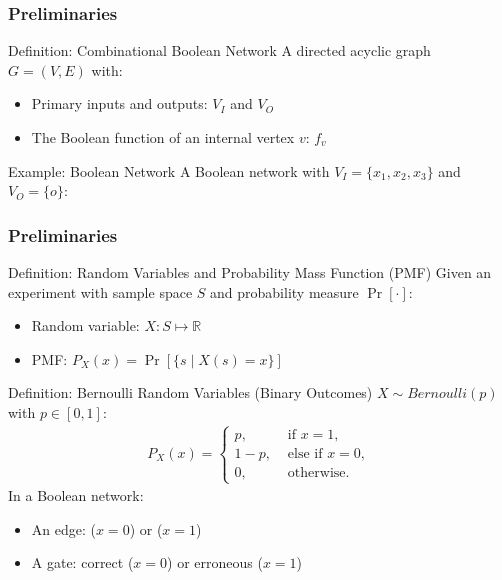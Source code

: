 \begin{frame}
  \frametitle{Preliminaries}
  \begin{block}{Definition: Combinational Boolean Network}
    A directed acyclic graph $G=(V,E)$ with:
    \pause
    \begin{itemize}
      \item Primary inputs and outputs: $V_I$ and $V_O$
            \pause
      \item The Boolean function of an internal vertex $v$: $f_v$
            \pause
    \end{itemize}
  \end{block}
  \begin{block}{Example: Boolean Network}
    A Boolean network with $V_I=\{x_1,x_2,x_3\}$ and $V_O=\{o\}$:
    \begin{figure}
      \centering
      
    \end{figure}
  \end{block}
\end{frame}

\begin{frame}
  \frametitle{Preliminaries}
  \begin{block}{Definition: Random Variables and Probability Mass Function (PMF)}
    Given an experiment with sample space $S$ and probability measure $\Pr[\cdot]$:
    \pause
    \begin{itemize}
      \item Random variable: $X:S\mapsto\mathbb{R}$
            \pause
      \item PMF: $P_X(x)=\Pr[\{s \mid X(s)=x\}]$
    \end{itemize}
  \end{block}
  \pause
  \begin{block}{Definition: Bernoulli Random Variables (Binary Outcomes)}
    $X\sim\textit{Bernoulli}(p)$ with $p\in[0,1]$:
    \pause
    \begin{align*}
      P_X(x)=
      \left\{
      \begin{array}{ll}
        p,   & \mbox{ if } x = 1,      \\
        1-p, & \mbox{ else if } x = 0, \\
        0,   & \mbox{ otherwise. }
      \end{array}
      \right.
    \end{align*}
    \pause
    In a Boolean network:
    \pause
    \begin{itemize}
      \item An edge: \false ($x=0$) or \true ($x=1$)
            \pause
      \item A gate: correct ($x=0$) or erroneous ($x=1$)
    \end{itemize}
  \end{block}
\end{frame}